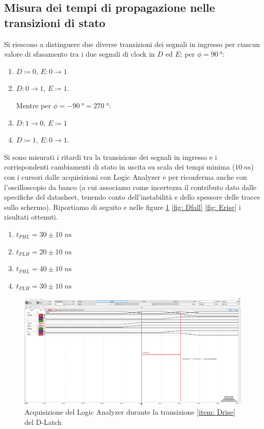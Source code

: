 \documentclass[10pt, a4paper, italian]{article}
\begin{document}
\subsection{Misura dei tempi di propagazione nelle transizioni di stato}
Si riescono a distinguere due diverse transizioni dei segnali in ingresso per
ciascun valore di sfasamento tra i due segnali di clock in $D$ ed $E$;
per $\phi = \SI{90}{\degree}$:
\begin{enumerate}
\item $D \coloneqq 0$, $E: 0 \to 1$ \label{item: Efall}
\item $D: 0 \to 1$, $E \coloneqq 1$. \label{item: Drise}

Mentre per $\phi = - \SI{90}{\degree} = 270 \; \si{\degree}$:
\item $D: 1 \to 0$, $E \coloneqq 1$ \label{item: Dfall}
\item $D \coloneqq 1$, $E: 0 \to 1$. \label{item: Erise}
\end{enumerate}

Si sono misurati i ritardi tra la transizione dei segnali in ingresso e i
corrispondenti cambiamenti di stato in uscita su scala dei tempi minima
($\SI{10}{n\s}$) con i cursori dalle acquisizioni con Logic Analyzer e per
riconferma anche con l'oscilloscopio da banco (a cui associamo come
incertezza il contributo dato dalle specifiche del datasheet, tenendo conto
dell'instabilità e dello spessore delle tracce sullo schermo). Riportiamo
di seguito e nelle figure \ref{fig: Drise} \ref{fig: Dfall} \ref{fig: Erise}
i risultati ottenuti.
\begin{enumerate}
\item $t_{PHL} = 30 \pm 10 \; \si{n\s}$
\item $t_{PLH} = 20 \pm 10 \; \si{n\s}$

\item $t_{PHL} = 40 \pm 10 \; \si{n\s}$
\item $t_{PLH} = 30 \pm 10 \; \si{n\s}$
\end{enumerate}

\begin{figure}[htbp]
    \centering
    \includegraphics[width=\textwidth]{dlatch_Drise}
    \caption{Acquisizione del Logic Analyzer durante la transizione
    \ref{item: Drise} del D-Latch \label{fig: Drise}}
\end{figure}
\end{document}
